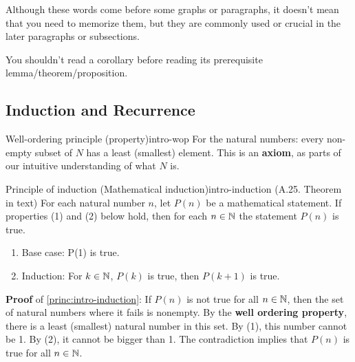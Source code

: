 \documentclass[../src/handouts/main.tex]{subfiles}
\begin{document}
Although these words come before some graphs or paragraphs, it doesn't mean that you need to memorize them, but they are commonly used or crucial in the later paragraphs or subsections.

You shouldn't read a corollary before reading its prerequisite lemma/theorem/proposition.

\subsection{Induction and Recurrence}

\begin{principle}{Well-ordering principle (property)}{intro-wop}
  For the natural numbers: every non-empty subset of $N$ has a least (smallest) element.
  This is an \textbf{axiom}, as parts of our intuitive understanding of what $N$ is.
\end{principle}

\begin{principle}{Principle of induction (Mathematical induction)}{intro-induction}
  (A.25. Theorem in text)
  For each natural number $n$, let $P(n)$ be a mathematical statement.
  If properties (1) and (2) below hold, then for each $n \in \mathbb{N}$ the statement $P(n)$ is true.
  \begin{enumerate}
    \item Base case: P(1) is true.
    \item Induction: For $k \in \mathbb{N}$, $P(k)$ is true, then $P(k + 1)$ is true.
  \end{enumerate}
\end{principle}

\textbf{Proof} of \cref{princ:intro-induction}:
If $P(n)$ is not true for all $n \in \mathbb{N}$, then the set of natural numbers where it fails is nonempty.
By the \textbf{well ordering property}, there is a least (smallest) natural number in this set.
By (1), this number cannot be 1.
By (2), it cannot be bigger than 1.
The contradiction implies that $P(n)$ is true for all $n \in \mathbb{N}$.
\end{document}
